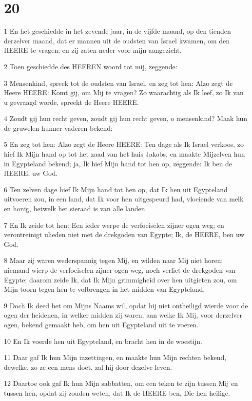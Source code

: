 \chapter{20}

\par 1 En het geschiedde in het zevende jaar, in de vijfde maand, op den tienden derzelver maand, dat er mannen uit de oudsten van Israel kwamen, om den HEERE te vragen; en zij zaten neder voor mijn aangezicht.
\par 2 Toen geschiedde des HEEREN woord tot mij, zeggende:
\par 3 Mensenkind, spreek tot de oudsten van Israel, en zeg tot hen: Alzo zegt de Heere HEERE: Komt gij, om Mij te vragen? Zo waarachtig als Ik leef, zo Ik van u gevraagd worde, spreekt de Heere HEERE.
\par 4 Zoudt gij hun recht geven, zoudt gij hun recht geven, o mensenkind? Maak hun de gruwelen hunner vaderen bekend;
\par 5 En zeg tot hen: Alzo zegt de Heere HEERE: Ten dage als Ik Israel verkoos, zo hief Ik Mijn hand op tot het zaad van het huis Jakobs, en maakte Mijzelven hun in Egypteland bekend; ja, Ik hief Mijn hand tot hen op, zeggende: Ik ben de HEERE, uw God.
\par 6 Ten zelven dage hief Ik Mijn hand tot hen op, dat Ik hen uit Egypteland uitvoeren zou, in een land, dat Ik voor hen uitgespeurd had, vloeiende van melk en honig, hetwelk het sieraad is van alle landen.
\par 7 En Ik zeide tot hen: Een ieder werpe de verfoeiselen zijner ogen weg; en verontreinigt ulieden niet met de drekgoden van Egypte; Ik, de HEERE, ben uw God.
\par 8 Maar zij waren wederspannig tegen Mij, en wilden naar Mij niet horen; niemand wierp de verfoeiselen zijner ogen weg, noch verliet de drekgoden van Egypte; daarom zeide Ik, dat Ik Mijn grimmigheid over hen uitgieten zou, om Mijn toorn tegen hen te volbrengen in het midden van Egypteland.
\par 9 Doch Ik deed het om Mijns Naams wil, opdat hij niet ontheiligd wierde voor de ogen der heidenen, in welker midden zij waren; aan welke Ik Mij, voor derzelver ogen, bekend gemaakt heb, om hen uit Egypteland uit te voeren.
\par 10 En Ik voerde hen uit Egypteland, en bracht hen in de woestijn.
\par 11 Daar gaf Ik hun Mijn inzettingen, en maakte hun Mijn rechten bekend, dewelke, zo ze een mens doet, zal hij door dezelve leven.
\par 12 Daartoe ook gaf Ik hun Mijn sabbatten, om een teken te zijn tussen Mij en tussen hen, opdat zij zouden weten, dat Ik de HEERE ben, Die hen heilige.

